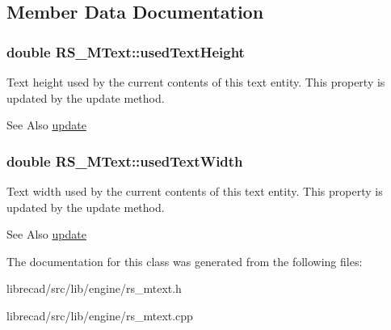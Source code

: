 \subsection{Member Data Documentation}
\hypertarget{classRS__MText_af928fb0bc4d1ee31e887c5366a5a2338}{
\subsubsection[{used\-Text\-Height}]{\setlength{\rightskip}{0pt plus 5cm}double R\-S\-\_\-\-M\-Text\-::used\-Text\-Height\hspace{0.3cm}{\ttfamily [protected]}}}\label{classRS__MText_af928fb0bc4d1ee31e887c5366a5a2338}
Text height used by the current contents of this text entity. This property is updated by the update method. \begin{DoxySeeAlso}{See Also}
\hyperlink{classRS__MText_a7a57c85433bfb4a67a3f34522deaa302}{update} 
\end{DoxySeeAlso}
\hypertarget{classRS__MText_a8083580be2a66e5b2009fcfbd2b9519e}{
\subsubsection[{used\-Text\-Width}]{\setlength{\rightskip}{0pt plus 5cm}double R\-S\-\_\-\-M\-Text\-::used\-Text\-Width\hspace{0.3cm}{\ttfamily [protected]}}}\label{classRS__MText_a8083580be2a66e5b2009fcfbd2b9519e}
Text width used by the current contents of this text entity. This property is updated by the update method. \begin{DoxySeeAlso}{See Also}
\hyperlink{classRS__MText_a7a57c85433bfb4a67a3f34522deaa302}{update} 
\end{DoxySeeAlso}


The documentation for this class was generated from the following files\-:\begin{DoxyCompactItemize}
\item 
librecad/src/lib/engine/rs\-\_\-mtext.\-h\item 
librecad/src/lib/engine/rs\-\_\-mtext.\-cpp\end{DoxyCompactItemize}
